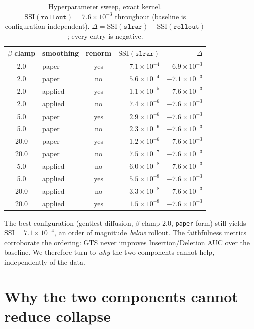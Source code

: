 \documentclass[11pt]{article}
\newcommand{\SSI}{\mathrm{SSI}}
\begin{document}
\begin{table}[h]
\centering
\caption{Hyperparameter sweep, exact kernel. $\SSI(\texttt{rollout})=7.6\times
10^{-3}$ throughout (baseline is configuration-independent).
$\Delta=\SSI(\texttt{slrar})-\SSI(\texttt{rollout})$; every entry is negative.}
\label{tab:sweep}
\begin{tabular}{c l c r r}
\toprule
$\beta$ clamp & smoothing & renorm & $\SSI(\texttt{slrar})$ & $\Delta$ \\
\midrule
2.0  & paper   & yes & $7.1\times 10^{-4}$ & $-6.9\times 10^{-3}$ \\
2.0  & paper   & no  & $5.6\times 10^{-4}$ & $-7.1\times 10^{-3}$ \\
2.0  & applied & yes & $1.1\times 10^{-5}$ & $-7.6\times 10^{-3}$ \\
2.0  & applied & no  & $7.4\times 10^{-6}$ & $-7.6\times 10^{-3}$ \\
5.0  & paper   & yes & $2.9\times 10^{-6}$ & $-7.6\times 10^{-3}$ \\
5.0  & paper   & no  & $2.3\times 10^{-6}$ & $-7.6\times 10^{-3}$ \\
20.0 & paper   & yes & $1.2\times 10^{-6}$ & $-7.6\times 10^{-3}$ \\
20.0 & paper   & no  & $7.5\times 10^{-7}$ & $-7.6\times 10^{-3}$ \\
5.0  & applied & no  & $6.0\times 10^{-8}$ & $-7.6\times 10^{-3}$ \\
5.0  & applied & yes & $5.5\times 10^{-8}$ & $-7.6\times 10^{-3}$ \\
20.0 & applied & no  & $3.3\times 10^{-8}$ & $-7.6\times 10^{-3}$ \\
20.0 & applied & yes & $1.5\times 10^{-8}$ & $-7.6\times 10^{-3}$ \\
\bottomrule
\end{tabular}
\end{table}

The best configuration (gentlest diffusion, $\beta$ clamp $2.0$, \texttt{paper}
form) still yields $\SSI=7.1\times10^{-4}$, an order of magnitude \emph{below}
rollout. The faithfulness metrics corroborate the ordering: GTS never improves
Insertion/Deletion AUC over the baseline. We therefore turn to \emph{why} the
two components cannot help, independently of the data.

\section{Why the two components cannot reduce collapse}
\end{document}
